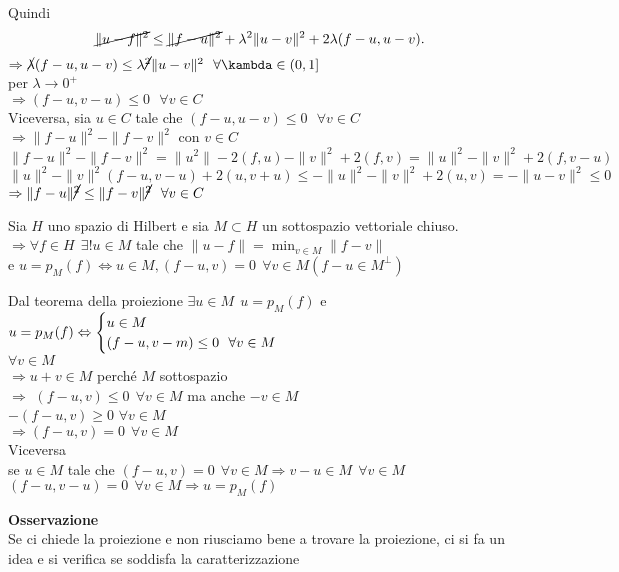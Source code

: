 \documentclass[12px]{article}
\begin{document}
\begin{dimo}
	Quindi
	 \[
		 \cancel{\|u-f\|^2}\leq \cancel{\|f-u\|^2} + \lambda^2\|u-v\|^2 + 2\lambda (f-u,u-v)
	.\] 
	$ \Rightarrow  \cancel{ \lambda}(f-u,u-v)\leq \lambda\cancel{^2}\|u-v\|^2 \ \ \forall \kambda \in (0,1]$ \\
	per $ \lambda \rightarrow 0^+$\\
	$ \Rightarrow  (f - u, v - u) \leq 0 \ \ \ \forall v\in C$ \\
	Viceversa, sia $u\in C$ tale che  $(f-u, u-v)\leq 0 \ \ \ \forall v\in C$ \\
	 $ \Rightarrow \|f-u\|^2 - \|f-v\|^2 $ con $v\in C$\\
	  \[
	 \|f-u\|^2 -\|f-v\|^2 = \|u^2\| - 2(f,u) - \|v\|^2 + 2(f,v) = \|u\|^2 - \|v\|^2 + 2(f,v-u)
	 \] 
	 \[
	 \|u\|^2 - \|v\|^2(f-u,v-u) + 2(u,v+u)\leq -\|u\|^2 - \|v\|^2 + 2(u,v) = -\|u-v\|^2\leq 0
	 \] 
	 $ \Rightarrow  \|f-u\|\cancel{^2} \leq \|f-v\|\cancel{^2} \ \ \forall v\in C$
  \end{dimo}
  \begin{coro}
  	Sia $H$ uno spazio di Hilbert e sia $M\subset H$ un sottospazio vettoriale chiuso.\\
	$ \Rightarrow  \forall f\in H \ \ \exists ! u\in M$ tale che $\|u-f\| = \min_{v\in M}\|f-v\|$\\
	e  $u = p_M(f) \Leftrightarrow u\in M, (f-u,v) = 0 \ \ \forall v\in M (f-u\in M^\perp)$
  \end{coro}
  \begin{dimo}
  	Dal teorema della proiezione $\exists u\in M \ \ u = p_M(f)$ e  $u = p_M(f)\\ \Leftrightarrow \begin{cases}
  		u\in M\\
		(f-u,v-m) \leq 0 \ \ \forall v\in M
  	\end{cases}$\\
	$\forall v\in M$\\
	 $ \Rightarrow  u + v\in M$ perché $ M$ sottospazio\\
	 $ \Rightarrow  $ $(f-u,v)\leq 0 \ \ \forall v\in M$
	 ma anche $-v\in M$\\
	  $-(f-u,v)\geq 0$  $\forall v\in M$\\
	   $ \Rightarrow  (f-u,v) = 0\ \ \forall v\in M$ \\
	   Viceversa \\
	   se $u\in M $ tale che  $(f-u,v) = 0 \ \ \forall v\in M \Rightarrow  v-u\in M \ \ \forall v\in M$   \\
	   $(f-u,v-u) = 0 \ \ \forall v\in M \Rightarrow  u = p_M(f)$
  \end{dimo}
  \textbf{Osservazione}\\
  Se ci chiede la proiezione e non riusciamo bene a trovare la proiezione, ci si fa un idea e si verifica se soddisfa la caratterizzazione
\end{document}
